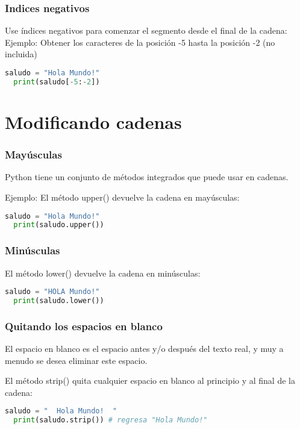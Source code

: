 \begin{frame}[fragile]
  \frametitle{Indices negativos}

  Use índices negativos para comenzar el segmento desde el final de la cadena:
  \vspace{\baselineskip}
  Ejemplo: Obtener los caracteres de la posición -5 hasta la posición -2 (no
  incluida)
  \begin{lstlisting}[language=Python]
  saludo = "Hola Mundo!"
  print(saludo[-5:-2])
  \end{lstlisting}
\end{frame}


\section{Modificando cadenas}

\begin{frame}[fragile]
  \frametitle{Mayúsculas}

  Python tiene un conjunto de métodos integrados que puede usar en cadenas.

  \vspace{\baselineskip}
  Ejemplo: El método \textcolor{codeKeyword}{upper}() devuelve la
  cadena en mayúsculas:
  \begin{lstlisting}[language=Python]
  saludo = "Hola Mundo!"
  print(saludo.upper())
  \end{lstlisting}
\end{frame}

\begin{frame}[fragile]
  \frametitle{Minúsculas}

  El método \textcolor{codeKeyword}{lower}() devuelve la
  cadena en minúsculas:

  \begin{lstlisting}[language=Python]
  saludo = "HOLA Mundo!"
  print(saludo.lower())
  \end{lstlisting}
\end{frame}

\begin{frame}[fragile]
  \frametitle{Quitando los espacios en blanco}

  El espacio en blanco es el espacio antes y/o después del texto real,
  y muy a menudo se desea eliminar este espacio.

  \vspace{\baselineskip}
  El método \textcolor{codeKeyword}{strip}() quita cualquier espacio en
  blanco al principio y al final de la cadena:

  \begin{lstlisting}[language=Python]
  saludo = "  Hola Mundo!  "
  print(saludo.strip()) # regresa "Hola Mundo!"
  \end{lstlisting}
\end{frame}


